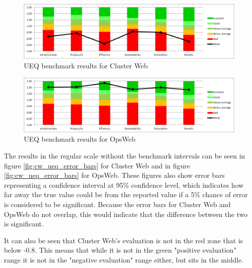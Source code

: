 \begin{figure}[ht]
  \begin{center}
    \includegraphics*[width=1\textwidth]{cw_ueq}
  \end{center}
  \caption{UEQ benchmark results for Cluster Web}
  \label{fig:cw_ueq}
\end{figure}

\begin{figure}[ht]
  \begin{center}
    \includegraphics*[width=1\textwidth]{ow_ueq}
  \end{center}
  \caption{UEQ benchmark results for OpsWeb}
  \label{fig:ow_ueq}
\end{figure}

The results in the regular scale without the benchmark intervals can be seen in figure \ref{fig:cw_ueq_error_bars} for Cluster Web and in figure \ref{fig:cw_ueq_error_bars} for OpsWeb. These figures also show error bars representing a confidence interval at 95\% confidence level, which indicates how far away the true value could be from the reported value if a 5\% chance of error is considered to be significant. Because the error bars for Cluster Web and OpsWeb do not overlap, this would indicate that the difference between the two is significant.

It can also be seen that Cluster Web's evaluation is not in the red zone that is below -0.8. This means that while it is not in the green "positive evaluation" range it is not in the "negative evaluation" range either, but sits in the middle.

